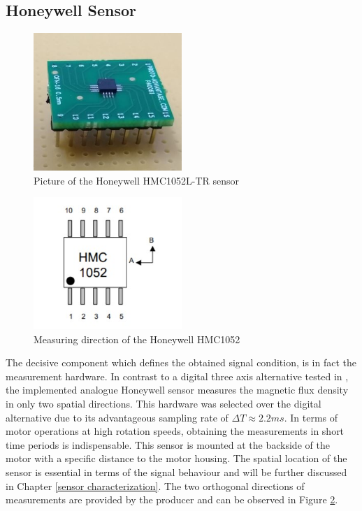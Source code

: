 \documentclass[english]{isasthesis}
\begin{document}
   		\subsection{Honeywell Sensor}\label{honeywell}
    	\begin{figure}[p]
                \begin{center}
                \includegraphics[width=0.5\textwidth]{figures/AnalogSensor.jpg}
                \end{center}
                \caption{Picture of the Honeywell HMC1052L-TR sensor \citep{fabian}}
                \label{fig:sensor}
          \end{figure}
          \begin{figure}[p]
                \begin{center}
                \includegraphics[width=0.5\textwidth]{figures/honeywell_axes.jpg}
                \end{center}
                \caption{Measuring direction of the Honeywell HMC1052 \citep{honeywell_2}}
                \label{fig:sensor_axes}
          \end{figure}
         The decisive component which defines the obtained signal condition, is in fact the measurement hardware. In contrast to a digital three axis alternative tested in \cite{fabian}, the implemented analogue Honeywell sensor measures the magnetic flux density in only two spatial directions. This hardware was selected over the digital alternative due to its advantageous sampling rate of $\Delta T \approx 2.2 ms$. In terms of motor operations at high rotation speeds, obtaining the measurements in short time periods is indispensable. This sensor is mounted at the backside of the motor with a specific distance to the motor housing. The spatial location of the sensor is essential in terms of the signal behaviour and will be further discussed in Chapter \ref{sensor characterization}. The two orthogonal directions of measurements are provided by the producer \cite{honeywell_2} and can be observed in Figure \ref{fig:sensor_axes}. \\ \\
\end{document}
